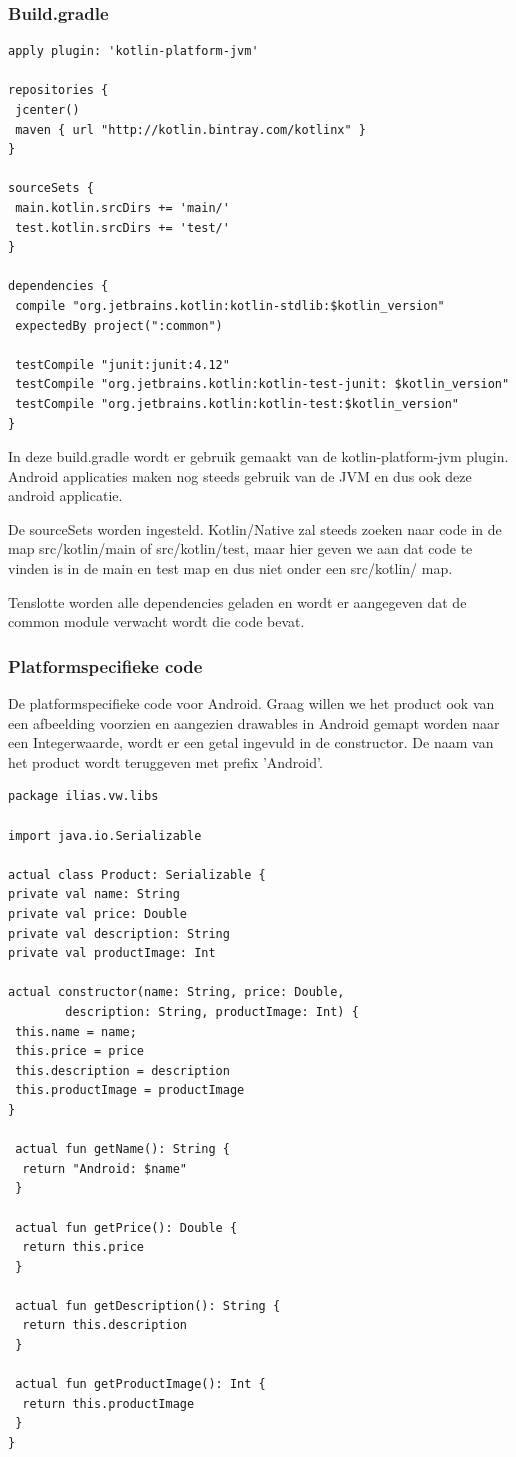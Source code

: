 \subsubsection{Build.gradle}
\begin{lstlisting}
apply plugin: 'kotlin-platform-jvm'

repositories {
 jcenter()
 maven { url "http://kotlin.bintray.com/kotlinx" }
}

sourceSets {
 main.kotlin.srcDirs += 'main/'
 test.kotlin.srcDirs += 'test/'
}

dependencies {
 compile "org.jetbrains.kotlin:kotlin-stdlib:$kotlin_version"
 expectedBy project(":common")

 testCompile "junit:junit:4.12"
 testCompile "org.jetbrains.kotlin:kotlin-test-junit: $kotlin_version"
 testCompile "org.jetbrains.kotlin:kotlin-test:$kotlin_version"
}
\end{lstlisting}

In deze build.gradle wordt er gebruik gemaakt van de kotlin-platform-jvm plugin. Android applicaties maken nog steeds gebruik van de JVM en dus ook deze android applicatie. 

De sourceSets worden ingesteld. Kotlin/Native zal steeds zoeken naar code in de map src/kotlin/main of src/kotlin/test, maar hier geven we aan dat code te vinden is in de main en test map en dus niet onder een src/kotlin/ map.

Tenslotte worden alle dependencies geladen en wordt er aangegeven dat de common module verwacht wordt die code bevat.

\subsubsection{Platformspecifieke code}
De platformspecifieke code voor Android. Graag willen we het product ook van een afbeelding voorzien en aangezien drawables in Android gemapt worden naar een Integerwaarde, wordt er een getal ingevuld in de constructor. De naam van het product wordt teruggeven met prefix 'Android'.
\begin{lstlisting}
package ilias.vw.libs

import java.io.Serializable

actual class Product: Serializable {
private val name: String
private val price: Double
private val description: String
private val productImage: Int

actual constructor(name: String, price: Double, 
		description: String, productImage: Int) {
 this.name = name;
 this.price = price
 this.description = description
 this.productImage = productImage
}

 actual fun getName(): String {
  return "Android: $name"
 }

 actual fun getPrice(): Double {
  return this.price
 }

 actual fun getDescription(): String {
  return this.description
 }

 actual fun getProductImage(): Int {
  return this.productImage
 }
}
\end{lstlisting}

